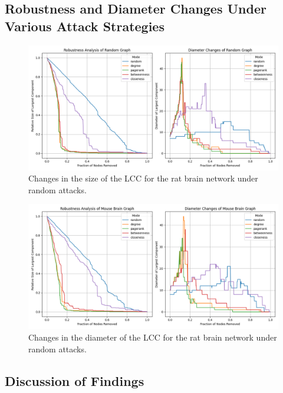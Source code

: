\documentclass[
	report, %
	11pt, %
]{CSUniSchoolLabReport}
\newcounter{ct}
\begin{document}
\subsection{Robustness and Diameter Changes Under Various Attack Strategies}
\begin{figure}[H]
    \centering
	\captionsetup{justification=centering}
    \includegraphics[width=\linewidth]{../plots/robustness-diameter-analysis-random-graph.png}
    \caption{Changes in the size of the LCC for the rat brain network under random attacks.}
    \label{fig:rat_random_lcc}
\end{figure}

\begin{figure}[H]
    \centering
	\captionsetup{justification=centering}
	\includegraphics[width=\textwidth]{../plots/robustness-diameter-analysis-mouse-brain-graph.png}
    \caption{Changes in the diameter of the LCC for the rat brain network under random attacks.}
    \label{fig:rat_random_diameter}
\end{figure}

\clearpage
\subsection{Discussion of Findings}
\end{document}

